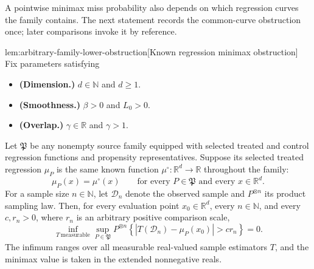 A pointwise minimax miss probability also depends on which regression curves the family contains. The next statement records the common-curve obstruction once; later comparisons invoke it by reference.

\begin{lemmav}{lem:arbitrary-family-lower-obstruction}[Known regression minimax obstruction]
Fix parameters satisfying
\begin{itemize}
\item \textbf{(Dimension.)} \(d\in\mathbb N\) and \(d\ge1\).
\item \textbf{(Smoothness.)} \(\beta>0\) and \(L_0>0\).
\item \textbf{(Overlap.)} \(\gamma\in\mathbb R\) and \(\gamma>1\).
\end{itemize}
Let \(\mathfrak P\) be any nonempty source family equipped with selected treated and control regression functions and propensity representatives. Suppose its selected treated regression \(\mu_P\) is the same known function \(\mu^\circ:\mathbb R^d\to\mathbb R\) throughout the family:
\[
\mu_P(x)=\mu^\circ(x)
\qquad
\text{for every }P\in\mathfrak P
\text{ and every }x\in\mathbb R^d.
\]
For a sample size \(n\in\mathbb N\), let \(\mathcal D_n\) denote the observed sample and \(P^{\otimes n}\) its product sampling law. Then, for every evaluation point \(x_0\in\mathbb R^d\), every \(n\in\mathbb N\), and every \(c,r_n>0\), where \(r_n\) is an arbitrary positive comparison scale,
\[
\inf_{T\ \mathrm{measurable}}
\sup_{P\in\mathfrak P}
P^{\otimes n}
\left\{\left|T(\mathcal D_n)-\mu_P(x_0)\right|>c r_n\right\}
=0.
\]
The infimum ranges over all measurable real-valued sample estimators \(T\), and the minimax value is taken in the extended nonnegative reals.


\end{lemmav}
